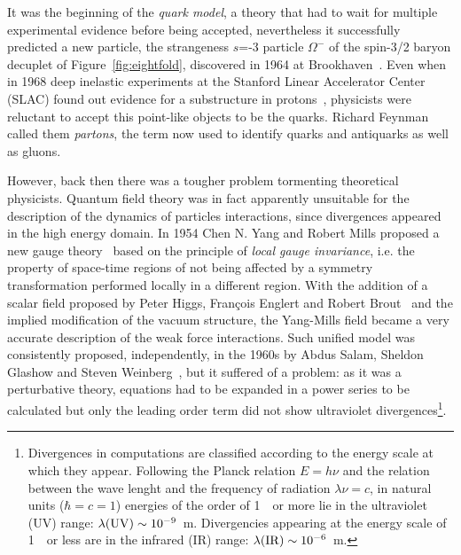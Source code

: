 It was the beginning of the {\it quark model}, a theory that had to 
wait for multiple experimental evidence before being accepted,
nevertheless it successfully predicted a new particle, the strangeness $s$=-3 
particle $\Omega^{-}$ of the spin-3/2 baryon decuplet of Figure~\ref{fig:eightfold},
discovered in 1964 at Brookhaven~\cite{PhysRevLett.12.204}. 
Even when in 1968 deep inelastic experiments at the Stanford 
Linear Accelerator Center (SLAC) found out evidence for a 
substructure in protons~\cite{PhysRevLett.23.930,PhysRevLett.23.935}, physicists were reluctant to accept 
this point-like objects to be the quarks. Richard Feynman called 
them \textit{partons}, the term now used to identify quarks 
and antiquarks as well as gluons.

However, back then there was a tougher problem tormenting theoretical physicists. 
Quantum field theory was in fact apparently unsuitable for the description 
of the dynamics of particles interactions, since divergences appeared in the 
high energy domain. In 1954 Chen N. Yang and Robert Mills proposed a new gauge 
theory~\cite{PhysRev.96.191} based on the principle of {\it local gauge invariance},
i.e. the property of space-time regions of not being affected 
by a symmetry transformation performed 
locally in a different region. With the addition of a scalar 
field proposed by Peter Higgs, 
Fran\c{c}ois Englert and Robert 
Brout~\cite{PhysRevLett.13.321,PhysRevLett.13.508} and the implied 
modification of the vacuum structure, the Yang-Mills field 
became a very accurate description of the weak force interactions. 
Such unified model was consistently proposed, independently, in the 1960s 
by Abdus Salam, Sheldon Glashow and Steven 
Weinberg~\cite{Glashow1961579,PhysRevLett.19.1264}, 
but it suffered of a problem: 
as it was a perturbative theory, equations 
had to be expanded in a power series to be calculated but only the leading order 
term did not show ultraviolet divergences\footnote{Divergences in computations
are classified according to the energy scale at which they appear. Following
the Planck relation $E=h\nu$ and the relation between the wave lenght and
the frequency of radiation $\lambda\nu = c$, in natural units 
($\hbar=c=1$) energies of the order of 1~\tev\ 
or more lie in the ultraviolet (UV) range: $\lambda({\rm UV})\sim 10^{-9}$~m.
Divergencies appearing at the energy scale of 1~\gev\ or less are in the 
infrared (IR) range: $\lambda({\rm IR})\sim 10^{-6}$~m.}.

